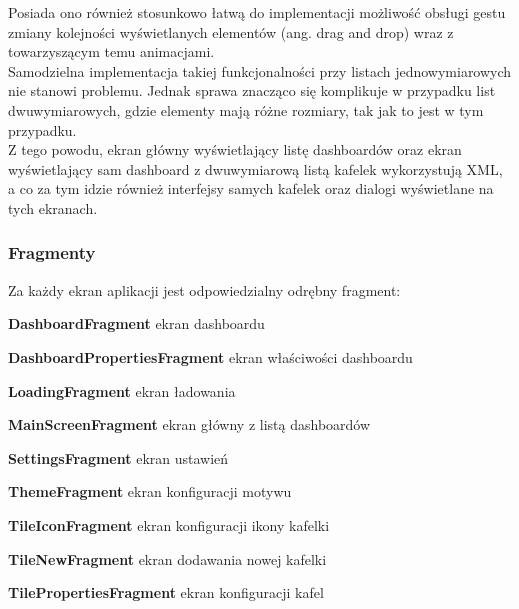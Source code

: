 Posiada ono również stosunkowo łatwą do implementacji możliwość obsługi gestu zmiany kolejności wyświetlanych elementów (ang. drag and drop) wraz z towarzyszącym temu animacjami.\\

Samodzielna implementacja takiej funkcjonalności przy listach jednowymiarowych nie stanowi problemu. Jednak sprawa znacząco się komplikuje w przypadku list dwuwymiarowych, gdzie elementy mają różne rozmiary, tak jak to jest w tym przypadku.\\

Z tego powodu, ekran główny wyświetlający listę dashboardów oraz ekran wyświetlający sam dashboard z dwuwymiarową listą kafelek wykorzystują XML, a co za tym idzie również interfejsy samych kafelek oraz dialogi wyświetlane na tych ekranach.

\newpage

\subsubsection{Fragmenty}
Za każdy ekran aplikacji jest odpowiedzialny odrębny fragment:

 {
    \tabeladwiekolumnywiersz
    {\textbf{DashboardFragment}}
    {ekran dashboardu}


    \tabeladwiekolumnywiersz
    {\textbf{DashboardPropertiesFragment}}
    {ekran właściwości dashboardu}

    \tabeladwiekolumnywiersz
    {\textbf{LoadingFragment}}
    {ekran ładowania}

    \tabeladwiekolumnywiersz
    {\textbf{MainScreenFragment}}
    {ekran główny z listą dashboardów}

    \tabeladwiekolumnywiersz
    {\textbf{SettingsFragment}}
    {ekran ustawień}

    \tabeladwiekolumnywiersz
    {\textbf{ThemeFragment}}
    {ekran konfiguracji motywu}

    \tabeladwiekolumnywiersz
    {\textbf{TileIconFragment}}
    {ekran konfiguracji ikony kafelki}

    \tabeladwiekolumnywiersz
    {\textbf{TileNewFragment}}
    {ekran dodawania nowej kafelki}

    \tabeladwiekolumnywiersz
    {\textbf{TilePropertiesFragment}}
    {ekran konfiguracji kafel}
}

